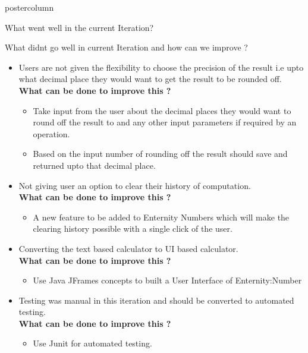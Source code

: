 \documentclass[final,hyperref={pdfpagelabels=false}]{beamer}
\begin{document}
\begin{frame}
\begin{columns}
\begin{column}{.49\textwidth}
\begin{beamercolorbox}[center,wd=\textwidth]{postercolumn}
\begin{minipage}[T]{.95\textwidth}
{\begin{block}{What went well in the current Iteration?}
            \end{block}
            \vfill
              \begin{block}{\smallskip What didnt go well in current Iteration and how can we improve ?}
              \begin{itemize}
              \item Users are not given the flexibility to choose the precision of the result i.e upto what decimal place they would want to get the result to be rounded off.\\
              \textbf{What can be done to improve this ?}
                \begin{itemize}
                \item Take input from the user about the decimal places they would want to  round off the result to and any other input parameters if required by an operation.
                \item Based on the input number of rounding off the result should save and returned upto that decimal place.
                \end{itemize}
              \item Not giving user an option to clear their history of computation.\\
              \textbf{What can be done to improve this ?}
                \begin{itemize}
                \item A new  feature to be added to Enternity Numbers which will make the clearing history possible with a single click of the user.                \end{itemize}
                 \item Converting the text based calculator to UI based calculator.\\
              \textbf{What can be done to improve this ?}
                \begin{itemize}
                \item Use Java JFrames concepts to built a User Interface of Enternity:Number
                \end{itemize}
                  \item Testing was manual in this iteration and should be converted to automated testing.\\
              \textbf{What can be done to improve this ?}
                \begin{itemize}
                \item Use Junit for automated testing.

\end{itemize}
\end{itemize}
\end{block}}
\end{minipage}
\end{beamercolorbox}
\end{column}
\end{columns}
\end{frame}
\end{document}
